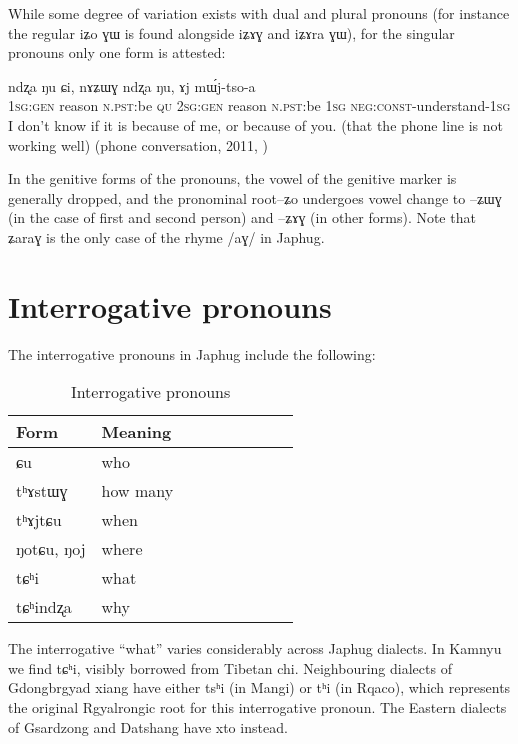 \documentclass[oldfontcommands,oneside,a4paper,11pt]{memoir}
\newcommand{\ipa}[1]{{\phon #1}} %
\newcommand{\wav}[1]{}%
\newcommand{\const}{\textsc{const}}
\newcommand{\gen}{\textsc{gen}}
\newcommand{\negat}{\textsc{neg}}
\newcommand{\npst}{\textsc{n.pst}}
\newcommand{\sg}{\textsc{sg}}
\begin{document}
While some degree of variation exists with dual and plural pronouns (for instance the regular \ipa{iʑo ɣɯ} is found alongside \ipa{iʑɤɣ} and \ipa{iʑɤra ɣɯ}), for the singular pronouns only one form is attested:

\begin{exe}
\ex
\gll \ipa{aʑɯɣ} 	\ipa{ndʐa} 	\ipa{ŋu} 	\ipa{ɕi,} 	\ipa{nɤʑɯɣ} 	\ipa{ndʐa} 	\ipa{ŋu,} 	\ipa{ɤj} 	\ipa{mɯ́j-tso-a}   \\
1\sg{}:\gen{} reason \npst{}:be \textsc{qu} 2\sg{}:\gen{} reason \npst{}:be 1\sg{} \negat{}:\const{}-understand-1\sg{}\\
\glt  I don't know if it is because of me, or because of you. (that the phone line is not working well) (phone conversation, 2011, \wav{8_ndzxa})
\end{exe} 

In the genitive forms of the pronouns, the vowel of the genitive marker is generally dropped, and the pronominal root--\ipa{ʑo} undergoes vowel change to --\ipa{ʑɯɣ} (in the case of first and second person) and --\ipa{ʑɤɣ} (in other forms). Note that \ipa{ʑaraɣ} is the only case of the rhyme /aɣ/ in Japhug.


\section{Interrogative pronouns}
The interrogative pronouns in Japhug include the following:
\begin{table}[H] \centering
\caption{Interrogative pronouns }\label{tab:interrog.pronoun}
\begin{tabular}{lllllllll} \toprule
Form & Meaning   \\
\midrule
\ipa{ɕu} & who \\
\ipa{tʰɤstɯɣ} & how many \\
\ipa{tʰɤjtɕu} & when \\
\ipa{ŋotɕu}, \ipa{ŋoj} & where \\
\ipa{tɕʰi} & what \\
\ipa{tɕʰindʐa} & why \\
\bottomrule
\end{tabular}
\end{table}
The interrogative  ``what'' varies considerably across Japhug dialects. In Kamnyu we find \ipa{tɕʰi}, visibly borrowed from Tibetan \ipa{chi}. Neighbouring dialects of Gdongbrgyad xiang have either \ipa{tsʰi} (in Mangi) or \ipa{tʰi} (in Rqaco), which represents the original Rgyalrongic root for this interrogative pronoun. The Eastern dialects of Gsardzong and Datshang have \ipa{xto} instead.
\end{document}
